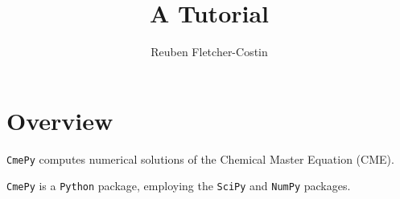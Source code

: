 \documentclass{article}
\title{A \cmepy{} Tutorial}
\author{Reuben Fletcher-Costin}
\newcommand{\mono}[1]{\texttt{#1}}
\newcommand{\cmepy}{\mono{CmePy}}
\newcommand{\python}{\mono{Python}}
\newcommand{\numpy}{\mono{NumPy}}
\newcommand{\scipy}{\mono{SciPy}}
\begin{document}
\maketitle

\tableofcontents

\section{Overview}

\cmepy{} computes numerical solutions of the
Chemical Master Equation (CME).

\cmepy{} is a \python{} package, employing the \scipy{} and \numpy{} packages.



\newpage


%

%



\end{document}
